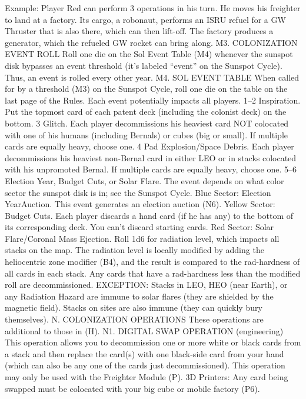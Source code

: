 \documentclass[a4paper]{book}
\begin{document}
Example: Player Red can perform 3 operations in his turn. He moves his freighter to land at a factory. Its cargo, a robonaut, performs an ISRU refuel for a GW Thruster that is also there, which can then lift-off. The factory produces a generator, which the refueled GW rocket can bring along.
M3. COLONIZATION EVENT ROLL
Roll one die on the Sol Event Table (M4) whenever the sunspot disk bypasses an event threshold (it’s labeled “event” on the Sunspot Cycle).
Thus, an event is rolled every other year.
M4. SOL EVENT TABLE
When called for by a threshold (M3) on the Sunspot Cycle, roll one die on the table on the last page of the Rules. Each event potentially impacts all players.
1–2	 Inspiration. Put the topmost card of each patent deck (including the colonist deck) on the bottom.
3	 Glitch. Each player decommissions his heaviest card NOT colocated with one of his humans (including Bernals) or cubes (big or small). If multiple cards are equally heavy, choose one.
4	Pad Explosion/Space Debris. Each player decommissions his heaviest non-Bernal card in either LEO or in stacks colocated with his unpromoted Bernal. If multiple cards are equally heavy, choose one.  
5–6	Election Year, Budget Cuts, or Solar Flare. The event depends on what color sector the sunspot disk is in; see the Sunspot Cycle.
Blue Sector: Election YearAuction. This event generates an election auction (N6).
Yellow Sector: Budget Cuts. Each player discards a hand card (if he has any) to the bottom of its corresponding deck. You can’t discard starting cards.
Red Sector: Solar Flare/Coronal Mass Ejection. Roll 1d6 for radiation level, which impacts all stacks on the map. The radiation level is locally modified by adding the heliocentric zone modifier (B4), and the result is compared to the rad-hardness of all cards in each stack. Any cards that have a rad-hardness less than the modified roll are decommissioned.
EXCEPTION: Stacks in LEO, HEO (near Earth), or any Radiation Hazard are immune to solar flares (they are shielded by the magnetic field). Stacks on sites are also immune (they can quickly bury themselves).
N. COLONIZATION OPERATIONS
These operations are additional to those in (H).
N1. DIGITAL SWAP OPERATION (engineering)
This operation allows you to decommission one or more white or black cards from a stack and then replace the card(s) with one black-side card from your hand (which can also be any one of the cards just decommissioned). This operation may only be used with the Freighter Module (P).
3D Printers: Any card being swapped must be colocated with your big cube or mobile factory (P6).
\end{document}
